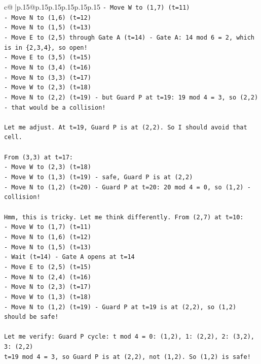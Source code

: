 \documentclass{article}
\begin{document}
{\begin{supertabular}{c@{$\;$}|p{.15\linewidth}@{}p{.15\linewidth}p{.15\linewidth}p{.15\linewidth}p{.15\linewidth}p{.15\linewidth}}
{{{\texttt{{-} Move W to (1,7) (t=11)} \\
\texttt{{-} Move N to (1,6) (t=12)} \\
\texttt{{-} Move N to (1,5) (t=13)} \\
\texttt{{-} Move E to (2,5) through Gate A (t=14) {-} Gate A: 14 mod 6 = 2, which is in \{2,3,4\}, so open!} \\
\texttt{{-} Move E to (3,5) (t=15)} \\
\texttt{{-} Move N to (3,4) (t=16)} \\
\texttt{{-} Move N to (3,3) (t=17)} \\
\texttt{{-} Move W to (2,3) (t=18)} \\
\texttt{{-} Move N to (2,2) (t=19) {-} but Guard P at t=19: 19 mod 4 = 3, so (2,2) {-} that would be a collision!} \\
\\ 
\texttt{Let me adjust. At t=19, Guard P is at (2,2). So I should avoid that cell.} \\
\\ 
\texttt{From (3,3) at t=17:} \\
\texttt{{-} Move W to (2,3) (t=18)} \\
\texttt{{-} Move W to (1,3) (t=19) {-} safe, Guard P is at (2,2)} \\
\texttt{{-} Move N to (1,2) (t=20) {-} Guard P at t=20: 20 mod 4 = 0, so (1,2) {-} collision!} \\
\\ 
\texttt{Hmm, this is tricky. Let me think differently. From (2,7) at t=10:} \\
\texttt{{-} Move W to (1,7) (t=11)} \\
\texttt{{-} Move N to (1,6) (t=12)} \\
\texttt{{-} Move N to (1,5) (t=13)} \\
\texttt{{-} Wait (t=14) {-} Gate A opens at t=14} \\
\texttt{{-} Move E to (2,5) (t=15)} \\
\texttt{{-} Move N to (2,4) (t=16)} \\
\texttt{{-} Move N to (2,3) (t=17)} \\
\texttt{{-} Move W to (1,3) (t=18)} \\
\texttt{{-} Move N to (1,2) (t=19) {-} Guard P at t=19 is at (2,2), so (1,2) should be safe!} \\
\\ 
\texttt{Let me verify: Guard P cycle: t mod 4 = 0: (1,2), 1: (2,2), 2: (3,2), 3: (2,2)} \\
\texttt{t=19 mod 4 = 3, so Guard P is at (2,2), not (1,2). So (1,2) is safe!} \\
}}}
\end{supertabular}}
\end{document}
